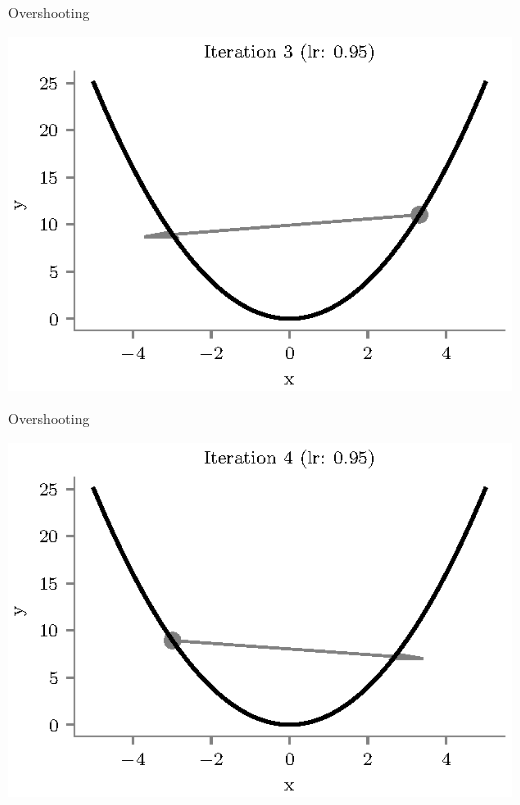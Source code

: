 \documentclass{beamer}
\begin{document}
\begin{frame}{Overshooting}
\begin{center}
\includegraphics[totalheight=6cm]{gradient-descent/overshooting-3.eps}
\end{center}
\end{frame}

\begin{frame}{Overshooting}
\begin{center}
\includegraphics[totalheight=6cm]{gradient-descent/overshooting-4.eps}
\end{center}
\end{frame}
\end{document}
